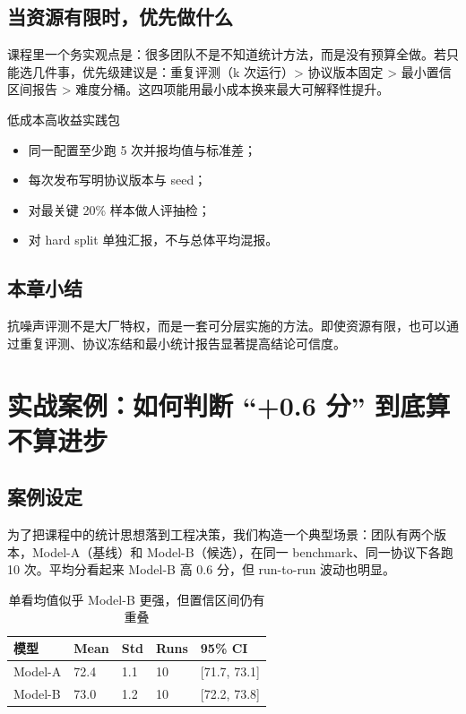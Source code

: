\documentclass[a4paper]{article}
\begin{document}
\subsection{当资源有限时，优先做什么}
课程里一个务实观点是：很多团队不是不知道统计方法，而是没有预算全做。若只能选几件事，优先级建议是：重复评测（k 次运行）> 协议版本固定 > 最小置信区间报告 > 难度分桶。这四项能用最小成本换来最大可解释性提升。

\begin{importantbox}{低成本高收益实践包}
\begin{itemize}
    \item 同一配置至少跑 5 次并报均值与标准差；
    \item 每次发布写明协议版本与 seed；
    \item 对最关键 20\% 样本做人评抽检；
    \item 对 hard split 单独汇报，不与总体平均混报。
\end{itemize}
\end{importantbox}

\subsection{本章小结}
抗噪声评测不是大厂特权，而是一套可分层实施的方法。即使资源有限，也可以通过重复评测、协议冻结和最小统计报告显著提高结论可信度。

\section{实战案例：如何判断 ``+0.6 分'' 到底算不算进步}

\subsection{案例设定}
为了把课程中的统计思想落到工程决策，我们构造一个典型场景：团队有两个版本，Model-A（基线）和 Model-B（候选），在同一 benchmark、同一协议下各跑 10 次。平均分看起来 Model-B 高 0.6 分，但 run-to-run 波动也明显。

\begin{table}[H]
\centering
\begin{tabular}{p{2.5cm}p{2.2cm}p{2.2cm}p{2.0cm}p{2.2cm}}
\toprule
\textbf{模型} & \textbf{Mean} & \textbf{Std} & \textbf{Runs} & \textbf{95\% CI} \\
\midrule
Model-A & 72.4 & 1.1 & 10 & [71.7, 73.1] \\
Model-B & 73.0 & 1.2 & 10 & [72.2, 73.8] \\
\bottomrule
\end{tabular}
\caption{单看均值似乎 Model-B 更强，但置信区间仍有重叠}
\end{table}
\end{document}
